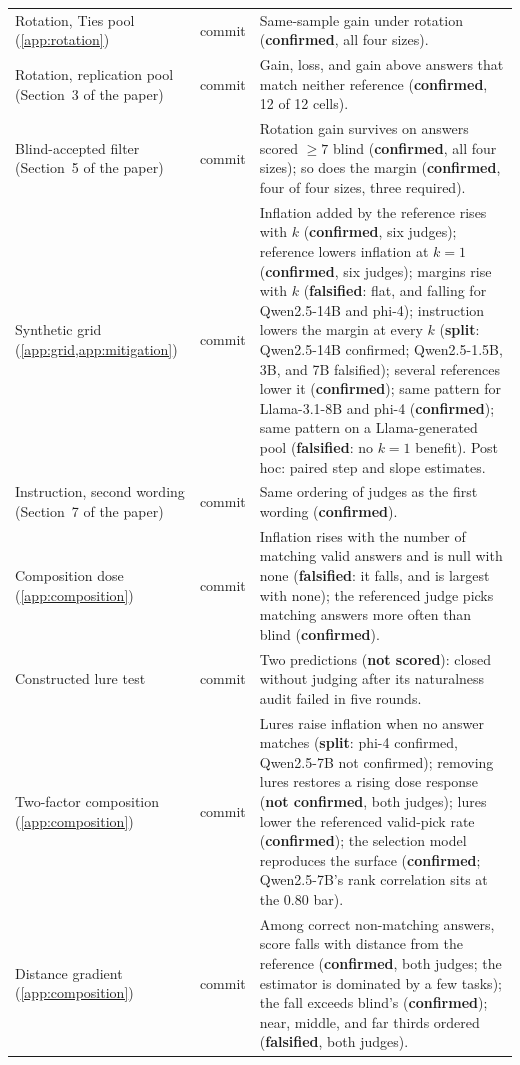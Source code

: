 {\begin{longtable}{L{3.2cm}L{1.1cm}L{8.7cm}}
Rotation, Ties pool (\cref{app:rotation}) & commit & Same-sample gain under rotation (\textbf{confirmed}, all four sizes). \\
Rotation, replication pool (Section~3 of the paper) & commit & Gain, loss, and gain above answers that match neither reference (\textbf{confirmed}, 12 of 12 cells). \\
Blind-accepted filter (Section~5 of the paper) & commit & Rotation gain survives on answers scored $\geq 7$ blind (\textbf{confirmed}, all four sizes); so does the margin (\textbf{confirmed}, four of four sizes, three required). \\
Synthetic grid (\cref{app:grid,app:mitigation}) & commit & Inflation added by the reference rises with $k$ (\textbf{confirmed}, six judges); reference lowers inflation at $k{=}1$ (\textbf{confirmed}, six judges); margins rise with $k$ (\textbf{falsified}: flat, and falling for Qwen2.5-14B and phi-4); instruction lowers the margin at every $k$ (\textbf{split}: Qwen2.5-14B confirmed; Qwen2.5-1.5B, 3B, and 7B falsified); several references lower it (\textbf{confirmed}); same pattern for Llama-3.1-8B and phi-4 (\textbf{confirmed}); same pattern on a Llama-generated pool (\textbf{falsified}: no $k{=}1$ benefit). Post hoc: paired step and slope estimates. \\
Instruction, second wording (Section~7 of the paper) & commit & Same ordering of judges as the first wording (\textbf{confirmed}). \\
Composition dose (\cref{app:composition}) & commit & Inflation rises with the number of matching valid answers and is null with none (\textbf{falsified}: it falls, and is largest with none); the referenced judge picks matching answers more often than blind (\textbf{confirmed}). \\
Constructed lure test & commit & Two predictions (\textbf{not scored}): closed without judging after its naturalness audit failed in five rounds. \\
Two-factor composition (\cref{app:composition}) & commit & Lures raise inflation when no answer matches (\textbf{split}: phi-4 confirmed, Qwen2.5-7B not confirmed); removing lures restores a rising dose response (\textbf{not confirmed}, both judges); lures lower the referenced valid-pick rate (\textbf{confirmed}); the selection model reproduces the surface (\textbf{confirmed}; Qwen2.5-7B's rank correlation sits at the 0.80 bar). \\
Distance gradient (\cref{app:composition}) & commit & Among correct non-matching answers, score falls with distance from the reference (\textbf{confirmed}, both judges; the estimator is dominated by a few tasks); the fall exceeds blind's (\textbf{confirmed}); near, middle, and far thirds ordered (\textbf{falsified}, both judges). \\

\end{longtable}}
